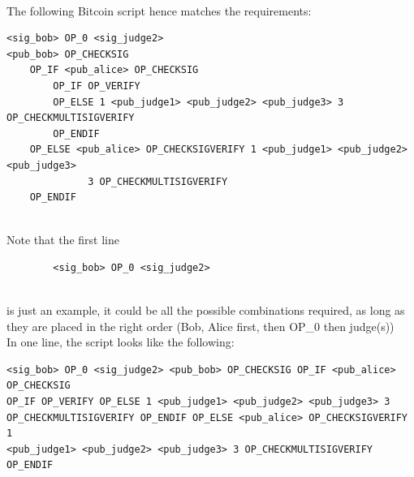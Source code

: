 \documentclass[11pt]{article}
\begin{document}
\begin{enumerate}
\begin{enumerate}
        \\ The following Bitcoin script hence matches the requirements:
        \begin{verbatim}
<sig_bob> OP_0 <sig_judge2>
<pub_bob> OP_CHECKSIG
    OP_IF <pub_alice> OP_CHECKSIG
        OP_IF OP_VERIFY 
        OP_ELSE 1 <pub_judge1> <pub_judge2> <pub_judge3> 3 OP_CHECKMULTISIGVERIFY
        OP_ENDIF
    OP_ELSE <pub_alice> OP_CHECKSIGVERIFY 1 <pub_judge1> <pub_judge2> <pub_judge3> 
              3 OP_CHECKMULTISIGVERIFY
    OP_ENDIF
        \end{verbatim}
        \\ Note that the first line
        \begin{verbatim}
        <sig_bob> OP_0 <sig_judge2>
        \end{verbatim}
        \\ is just an example, it could be all the possible combinations required, as long as they are placed in the right order (Bob, Alice first, then OP\_0 then judge(s))
        \\ In one line, the script looks like the following:
        \begin{verbatim}
<sig_bob> OP_0 <sig_judge2> <pub_bob> OP_CHECKSIG OP_IF <pub_alice> OP_CHECKSIG 
OP_IF OP_VERIFY OP_ELSE 1 <pub_judge1> <pub_judge2> <pub_judge3> 3 
OP_CHECKMULTISIGVERIFY OP_ENDIF OP_ELSE <pub_alice> OP_CHECKSIGVERIFY 1 
<pub_judge1> <pub_judge2> <pub_judge3> 3 OP_CHECKMULTISIGVERIFY OP_ENDIF
        \end{verbatim}
        
        
    \end{enumerate}


\end{enumerate}
\end{document}
